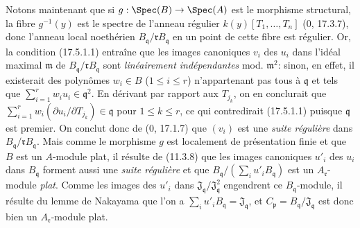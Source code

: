Notons maintenant que si $g:\Spec(B)\to\Spec(A)$ est le morphisme structural, la fibre $g^{-1}(y)$ est le spectre de l'anneau régulier $k(y)[T_1,\ldots,T_n]$ (0, 17.3.7), donc l'anneau local noethérien $B_{\mathfrak q}/\mathfrak rB_{\mathfrak q}$ en un point de cette fibre est régulier. Or, la condition (17.5.1.1) entraîne que les images canoniques $v_i$ des $u_i$ dans l'idéal maximal $\mathfrak m$ de $B_{\mathfrak q}/\mathfrak rB_{\mathfrak q}$ sont \emph{linéairement indépendantes} mod. $\mathfrak m^2$: sinon, en effet, il existerait des polynômes $w_i\in B$ ($1\leq i\leq r$) n'appartenant pas tous à $\mathfrak q$ et tels que $\sum_{i=1}^r w_i u_i\in\mathfrak q^2$. En dérivant par rapport aux $T_{j_k}$, on en conclurait que $\sum_{i=1}^r w_i(\partial u_i/\partial T_{j_k})\in\mathfrak q$ pour $1\leq k\leq r$, ce qui contredirait (17.5.1.1) puisque $\mathfrak q$ est premier. On conclut donc de (0, 17.1.7) que $(v_i)$ est une \emph{suite régulière} dans $B_{\mathfrak q}/\mathfrak rB_{\mathfrak q}$. Mais comme le morphisme $g$ est localement de présentation finie et que $B$ est un $A$-module plat, il résulte de (11.3.8) que les images canoniques $u'_i$ des $u_i$ dans $B_{\mathfrak q}$ forment aussi une \emph{suite régulière} et que $B_{\mathfrak q}/(\sum_i u'_iB_{\mathfrak q})$ est un $A_{\mathfrak r}$-module \emph{plat}. Comme les images des $u'_i$ dans $\mathfrak J_{\mathfrak q}/\mathfrak J_{\mathfrak q}^2$ engendrent ce $B_{\mathfrak q}$-module, il résulte du lemme de Nakayama que l'on a $\sum_i u'_iB_{\mathfrak q}=\mathfrak J_{\mathfrak q}$, et $C_{\mathfrak p}=B_{\mathfrak q}/\mathfrak J_{\mathfrak q}$ est donc bien un $A_{\mathfrak r}$-module plat.

